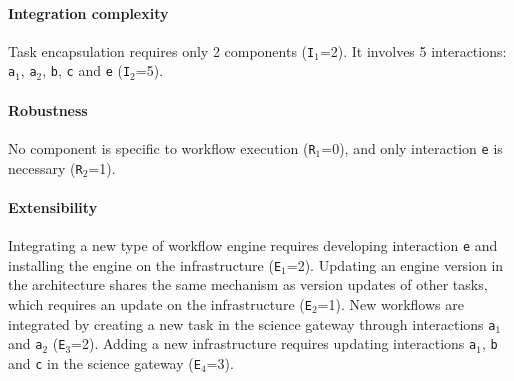 \documentclass[preprint,3p,twocolumn]{elsarticle}
\newcommand{\todo}[2]{\pdfmargincomment[color=red,author=#1,open=true]{#2}}
\begin{document}
\paragraph{Integration complexity} Task encapsulation requires only 2
components (\texttt{I$_1$}=2).  It involves 5 interactions:
\texttt{a$_1$}, \texttt{a$_2$}, \texttt{b}, \texttt{c} and
\texttt{e} (\texttt{I$_2$}=5).

\paragraph{Robustness} No component is specific to workflow execution
(\texttt{R$_1$}=0), and only interaction \texttt{e} is necessary
(\texttt{R$_2$}=1).

\paragraph{Extensibility} Integrating a new type of workflow engine
requires developing interaction \texttt{e} and  installing the engine
on the infrastructure (\texttt{E$_1$}=2). Updating an engine version
in the architecture shares the same mechanism as version updates of
other tasks, which requires an update on the
infrastructure (\texttt{E$_2$}=1).  New workflows are integrated by
creating a new task in the science gateway through interactions
\texttt{a$_1$} and \texttt{a$_2$} (\texttt{E$_3$}=2). Adding a new
infrastructure requires updating interactions \texttt{a$_1$},
\texttt{b} and \texttt{c} in the science gateway (\texttt{E$_4$}=3).

\end{document}

